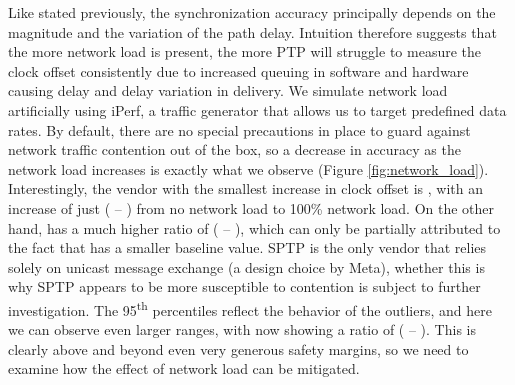 Like stated previously, the synchronization accuracy principally depends on the magnitude and the variation of the path delay. Intuition therefore suggests that the more network load is present, the more PTP will struggle to measure the clock offset consistently due to increased queuing in software and hardware causing delay and delay variation in delivery. We simulate network load artificially using iPerf, a traffic generator that allows us to target predefined data rates. By default, there are no special precautions in place to guard against network traffic contention out of the box, so a decrease in accuracy as the network load increases is exactly what we observe (Figure \ref{fig:network_load}). Interestingly, the vendor with the smallest increase in clock offset is \fVendor{\cmpMinArg}, with an increase of just \fRatio[1]{\cmpMin} ( -- ) from no network load to 100\% network load. On the other hand, \fVendor{\cmpMaxArg} has a much higher ratio of \fRatio{\cmpMax} ( -- ), which can only be partially attributed to the fact that \fVendor{\cmpMaxArg} has a smaller baseline value.
%
SPTP is the only vendor that relies solely on unicast message exchange (a design choice by Meta), whether this is why SPTP appears to be more susceptible to contention is subject to further investigation.%
%
%
The 95\textsuperscript{th} percentiles reflect the behavior of the outliers, and here we can observe even larger ranges, with \fVendor{\cmpMaxArg} now showing a ratio of \fRatio[-1]{\cmpMax} ( -- ). This is clearly above and beyond even very generous safety margins, so we need to examine how the effect of network load can be mitigated.

